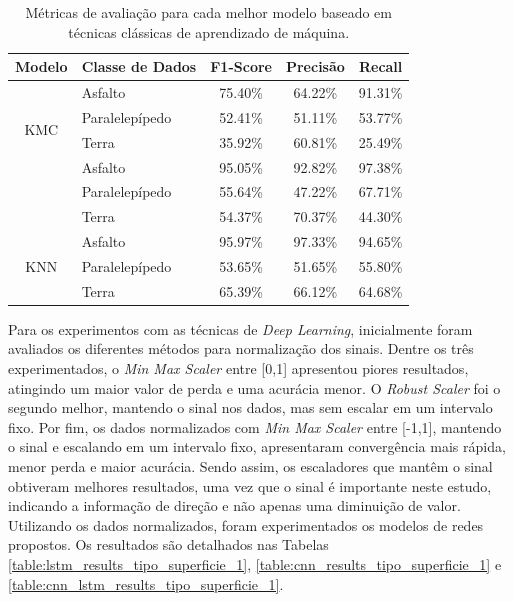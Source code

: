 \begin{table}[H]
\scriptsize
\centering
\caption{Métricas de avaliação para cada melhor modelo baseado em técnicas clássicas de aprendizado de máquina.} 
\label{table:classical_ml_metrics_tipo_superficie_1}
\begin{tabular}{clccc}
\toprule
\textbf{Modelo} & \multicolumn{1}{c}{\textbf{Classe de Dados}} & \textbf{F1-Score} & \textbf{Precisão} & \textbf{Recall} \\ \midrule
\multirow{4}{*}{KMC} & Asfalto & 75.40\% & 64.22\% & 91.31\% \\ \cmidrule(l){2-5} 
 & Paralelepípedo & 52.41\% & 51.11\% & 53.77\% \\ \cmidrule(l){2-5} 
 & Terra & 35.92\% & 60.81\% & 25.49\% \\ \midrule
\multirow{4}{*}{SVM} & Asfalto & 95.05\% & 92.82\% & 97.38\% \\ \cmidrule(l){2-5} 
 & Paralelepípedo & 55.64\% & 47.22\% & 67.71\% \\ \cmidrule(l){2-5} 
 & Terra & 54.37\% & 70.37\% & 44.30\% \\ \midrule
\multirow{4}{*}{KNN} & Asfalto & 95.97\% & 97.33\% & 94.65\% \\ \cmidrule(l){2-5} 
 & Paralelepípedo & 53.65\% & 51.65\% & 55.80\% \\ \cmidrule(l){2-5} 
 & Terra & 65.39\% & 66.12\% & 64.68\% \\ \bottomrule
\end{tabular}
\end{table}

Para os experimentos com as técnicas de \textit{Deep Learning}, inicialmente foram avaliados os diferentes métodos para normalização dos sinais. Dentre os três experimentados, o \textit{Min Max Scaler} entre [0,1] apresentou piores resultados, atingindo um maior valor de perda e uma acurácia menor. O \textit{Robust Scaler} foi o segundo melhor, mantendo o sinal nos dados, mas sem escalar em um intervalo fixo. Por fim, os dados normalizados com \textit{Min Max Scaler} entre [-1,1], mantendo o sinal e escalando em um intervalo fixo, apresentaram convergência mais rápida, menor perda e maior acurácia. Sendo assim, os escaladores que mantêm o sinal obtiveram melhores resultados, uma vez que o sinal é importante neste estudo, indicando a informação de direção e não apenas uma diminuição de valor. Utilizando os dados normalizados, foram experimentados os modelos de redes propostos. Os resultados são detalhados nas Tabelas \ref{table:lstm_results_tipo_superficie_1}, \ref{table:cnn_results_tipo_superficie_1} e \ref{table:cnn_lstm_results_tipo_superficie_1}.

